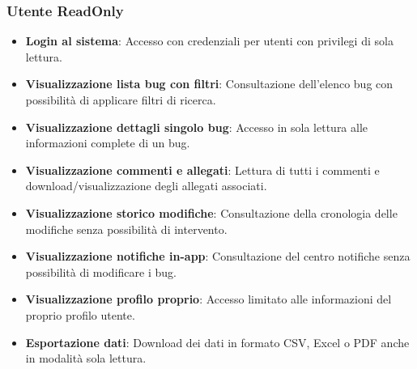 ﻿\documentclass[a4paper,11pt]{article}
\begin{document}
\subsubsection{Utente ReadOnly}
\begin{itemize}
  \item \textbf{Login al sistema}: Accesso con credenziali per utenti con privilegi di sola lettura.
  \item \textbf{Visualizzazione lista bug con filtri}: Consultazione dell'elenco bug con possibilit\`a di applicare filtri di ricerca.
  \item \textbf{Visualizzazione dettagli singolo bug}: Accesso in sola lettura alle informazioni complete di un bug.
  \item \textbf{Visualizzazione commenti e allegati}: Lettura di tutti i commenti e download/visualizzazione degli allegati associati.
  \item \textbf{Visualizzazione storico modifiche}: Consultazione della cronologia delle modifiche senza possibilit\`a di intervento.
  \item \textbf{Visualizzazione notifiche in-app}: Consultazione del centro notifiche senza possibilit\`a di modificare i bug.
  \item \textbf{Visualizzazione profilo proprio}: Accesso limitato alle informazioni del proprio profilo utente.
  \item \textbf{Esportazione dati}: Download dei dati in formato CSV, Excel o PDF anche in modalit\`a sola lettura.
\end{itemize}
\end{document}
